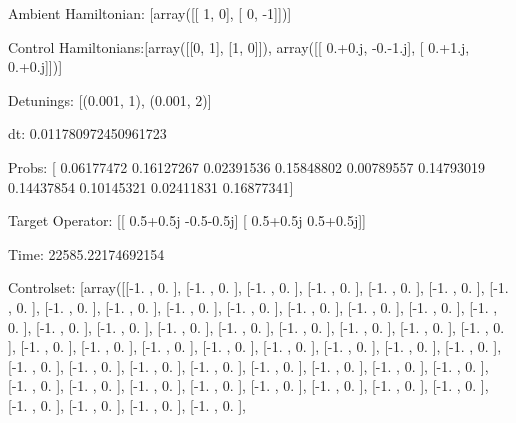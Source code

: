 \documentclass{article}
\begin{document}
    

\newpage

Ambient Hamiltonian: [array([[ 1,  0],
       [ 0, -1]])]

Control Hamiltonians:[array([[0, 1],
       [1, 0]]), array([[ 0.+0.j, -0.-1.j],
       [ 0.+1.j,  0.+0.j]])]

Detunings: [(0.001, 1), (0.001, 2)]

 dt: 0.011780972450961723

Probs: [ 0.06177472  0.16127267  0.02391536  0.15848802  0.00789557  0.14793019
  0.14437854  0.10145321  0.02411831  0.16877341]

Target Operator: [[ 0.5+0.5j -0.5-0.5j]
 [ 0.5+0.5j  0.5+0.5j]]

Time: 22585.22174692154

Controlset: [array([[-1.        ,  0.        ],
       [-1.        ,  0.        ],
       [-1.        ,  0.        ],
       [-1.        ,  0.        ],
       [-1.        ,  0.        ],
       [-1.        ,  0.        ],
       [-1.        ,  0.        ],
       [-1.        ,  0.        ],
       [-1.        ,  0.        ],
       [-1.        ,  0.        ],
       [-1.        ,  0.        ],
       [-1.        ,  0.        ],
       [-1.        ,  0.        ],
       [-1.        ,  0.        ],
       [-1.        ,  0.        ],
       [-1.        ,  0.        ],
       [-1.        ,  0.        ],
       [-1.        ,  0.        ],
       [-1.        ,  0.        ],
       [-1.        ,  0.        ],
       [-1.        ,  0.        ],
       [-1.        ,  0.        ],
       [-1.        ,  0.        ],
       [-1.        ,  0.        ],
       [-1.        ,  0.        ],
       [-1.        ,  0.        ],
       [-1.        ,  0.        ],
       [-1.        ,  0.        ],
       [-1.        ,  0.        ],
       [-1.        ,  0.        ],
       [-1.        ,  0.        ],
       [-1.        ,  0.        ],
       [-1.        ,  0.        ],
       [-1.        ,  0.        ],
       [-1.        ,  0.        ],
       [-1.        ,  0.        ],
       [-1.        ,  0.        ],
       [-1.        ,  0.        ],
       [-1.        ,  0.        ],
       [-1.        ,  0.        ],
       [-1.        ,  0.        ],
       [-1.        ,  0.        ],
       [-1.        ,  0.        ],
       [-1.        ,  0.        ],
       [-1.        ,  0.        ],
       [-1.        ,  0.        ],
       [-1.        ,  0.        ],
       [-1.        ,  0.        ],
       [-1.        ,  0.        ],
       [-1.        ,  0.        ],
       [-1.        ,  0.        ],
\end{document}
